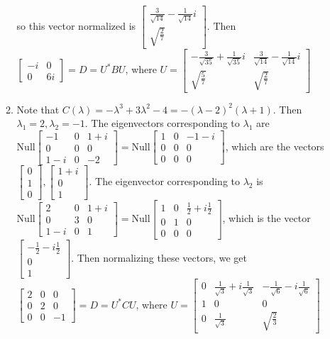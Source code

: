 \documentclass[10pt,english]{article}
\begin{document}
\begin{enumerate}
\begin{enumerate}
so this vector normalized is $\begin{bmatrix}\frac{3}{\sqrt{14}}-\frac{1}{\sqrt{14}}i\\\sqrt{\frac{2}{7}}\end{bmatrix}$. Then $\begin{bmatrix}-i&0\\0&6i\end{bmatrix}=D=U^*BU$, where $U=\begin{bmatrix}-\frac{3}{\sqrt{35}}+\frac{1}{\sqrt{35}}i&\frac{3}{\sqrt{14}}-\frac{1}{\sqrt{14}}i\\\sqrt{\frac{5}{7}}&\sqrt{\frac{2}{7}}\end{bmatrix}$
    
    
    \item Note that $C(\lambda)=-\lambda^3+3\lambda^2-4=-(\lambda-2)^2(\lambda+1)$. Then $\lambda_1=2,\lambda_2=-1$. The eigenvectors corresponding to $\lambda_1$ are $\text{Null}\begin{bmatrix}-1&0&1+i\\0&0&0\\1-i&0&-2\end{bmatrix}=\text{Null}\begin{bmatrix}1&0&-1-i\\0&0&0\\0&0&0\end{bmatrix}$, which are the vectors $\begin{bmatrix}0\\1\\0\end{bmatrix},\begin{bmatrix}1+i\\0\\1\end{bmatrix}$. The eigenvector corresponding to $\lambda_2$ is $\text{Null}\begin{bmatrix}2&0&1+i\\0&3&0\\1-i&0&1\end{bmatrix}=\text{Null}\begin{bmatrix}1&0&\frac{1}{2}+i\frac{1}{2}\\0&1&0\\0&0&0\end{bmatrix}$, which is the vector $\begin{bmatrix}-\frac{1}{2}-i\frac{1}{2}\\0\\1\end{bmatrix}$. Then normalizing these vectors, we get $\begin{bmatrix}2&0&0\\0&2&0\\0&0&-1\end{bmatrix}=D=U^*CU$, where $U=\begin{bmatrix}0&\frac{1}{\sqrt{3}}+i\frac{1}{\sqrt{3}}&-\frac{1}{\sqrt{6}}-i\frac{1}{\sqrt{6}}\\1&0&0\\0&\frac{1}{\sqrt{3}}&\sqrt{\frac{2}{3}}\end{bmatrix}$
\end{enumerate}

\end{enumerate}
\end{document}
